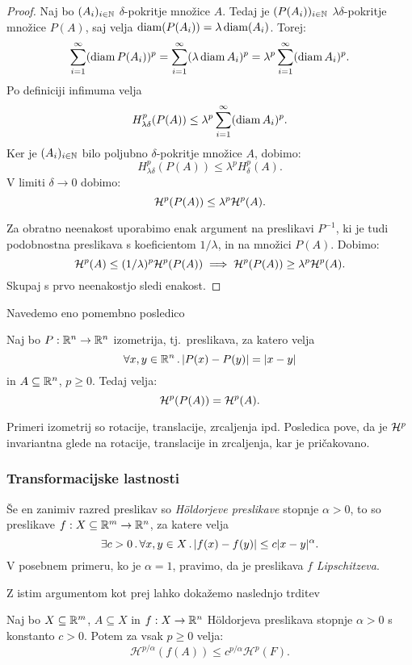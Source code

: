 \begin{proof}
    Naj bo \((A_i)_{i \in \mathbb{N}}\) \(\delta\)-pokritje množice \(A\). Tedaj je \((P(A_i))_{i \in \mathbb{N}}\) \(\lambda \delta\)-pokritje množice \(P(A)\), saj velja \(\operatorname{diam}(P(A_i)) = \lambda \operatorname{diam}(A_i)\). Torej:
    \[\sum_{i=1}^{\infty} (\operatorname{diam} P(A_i))^p = \sum_{i=1}^{\infty}(\lambda \operatorname{diam} A_i)^p = \lambda^p \sum_{i=1}^{\infty}(\operatorname{diam} A_i)^p.\]
    Po definiciji infimuma velja 
    \[H^p_{\lambda \delta} (P(A)) \leq \lambda^p \sum_{i=1}^{\infty}(\operatorname{diam} A_i)^p.\]
    Ker je \((A_i)_{i \in \mathbb{N}}\) bilo poljubno \(\delta\)-pokritje množice \(A\), dobimo:
    \[H^p_{\lambda \delta} (P(A)) \leq \lambda^p H^p_\delta(A).\]
    V limiti \(\delta \to 0\) dobimo:
    \[\mathcal{H}^p (P(A)) \leq \lambda^p \mathcal{H}^p(A).\]    
    
    Za obratno neenakost uporabimo enak argument na preslikavi \(P^{-1}\), ki je tudi podobnostna preslikava s koeficientom \(1/\lambda\), in na množici \(P(A)\). Dobimo:
    \[
        \mathcal{H}^p(A) \leq (1/\lambda)^p \mathcal{H}^p(P(A)) \implies \mathcal{H}^p(P(A)) \geq \lambda^p \mathcal{H}^p(A).
    \]
    Skupaj s prvo neenakostjo sledi enakost.
\end{proof}

Navedemo eno pomembno posledico

\begin{posledica}
    Naj bo \(P: \mathbb{R}^n \to \mathbb{R}^n\) izometrija, tj.\ preslikava, za katero velja
    \[\forall x, y \in \mathbb{R}^n \,.\, |P(x) - P(y)| = |x - y|\]
    in \(A \subseteq \mathbb{R}^n\), \(p \geq 0\). Tedaj velja:
    \[\mathcal{H}^p(P(A)) = \mathcal{H}^p(A).\]    
\end{posledica}

Primeri izometrij so rotacije, translacije, zrcaljenja ipd. Posledica pove, da je \(\mathcal{H}^p\) invariantna glede na rotacije, translacije in zrcaljenja, kar je pričakovano.

\subsubsection{Transformacijske lastnosti}
Še en zanimiv razred preslikav so \emph{H\"oldorjeve preslikave} stopnje \(\alpha > 0\), to so preslikave \(f: X \subseteq \mathbb{R}^m \to \mathbb{R}^n\), za katere velja
\[\exists c > 0 \,.\, \forall x, y \in X \,.\, |f(x) - f(y)| \leq c|x-y|^\alpha.\]
V posebnem primeru, ko je \(\alpha = 1\), pravimo, da je preslikava \(f\) \emph{Lipschitzeva}.

Z istim argumentom kot prej lahko dokažemo naslednjo trditev
\begin{trditev}
    \label{mera-hold}
    Naj bo \(X \subseteq \mathbb{R}^m\), \(A \subseteq X\) in \(f: X \to \mathbb{R}^n\) Höldorjeva preslikava stopnje \(\alpha > 0\) s konstanto \(c > 0\). Potem za vsak \(p \geq 0\) velja:
    \[\mathcal{H}^{p/\alpha}(f(A)) \leq c^{p/\alpha} \mathcal{H}^p(F).\]
\end{trditev}

